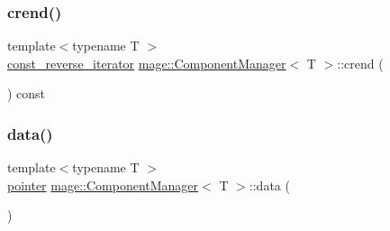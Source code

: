 \mbox{\label{classmage_1_1_component_manager_acc2979afe7b7c7a522471c898524d9c4}} 
\subsubsection{\texorpdfstring{crend()}{crend()}}
{\footnotesize\ttfamily template$<$typename T $>$ \\
\mbox{\hyperlink{classmage_1_1_component_manager_a00481d8beab5d950124f54c0f832da53}{const\+\_\+reverse\+\_\+iterator}} \mbox{\hyperlink{classmage_1_1_component_manager}{mage\+::\+Component\+Manager}}$<$ T $>$\+::crend (\begin{DoxyParamCaption}{ }\end{DoxyParamCaption}) const\hspace{0.3cm}{\ttfamily [noexcept]}}

\mbox{\label{classmage_1_1_component_manager_ac9c6e209d82b09cf1d6c3893ed66efa3}} 
\subsubsection{\texorpdfstring{data()}{data()}\hspace{0.1cm}{\footnotesize\ttfamily [1/2]}}
{\footnotesize\ttfamily template$<$typename T $>$ \\
\mbox{\hyperlink{classmage_1_1_component_manager_a8a96debf4c395e068990c85e8b66d564}{pointer}} \mbox{\hyperlink{classmage_1_1_component_manager}{mage\+::\+Component\+Manager}}$<$ T $>$\+::data (\begin{DoxyParamCaption}{ }\end{DoxyParamCaption})\hspace{0.3cm}{\ttfamily [noexcept]}}

\mbox{\label{classmage_1_1_component_manager_a77452ebe6099db2d2ced2788a06c2c74}} 
